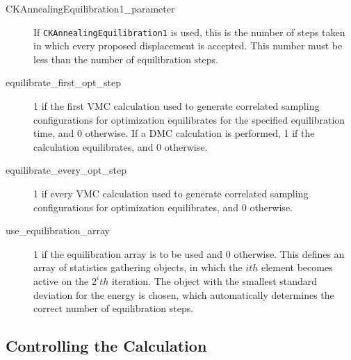 \documentclass[11pt]{article}
\begin{document}
\begin{description}
\item [CKAnnealingEquilibration1\_parameter]  If
  \verb-CKAnnealingEquilibration1- is used, this is the number of
  steps taken in which every proposed displacement is accepted.  This
  number must be less than the number of equilibration steps.  
 
\item [equilibrate\_first\_opt\_step] 1 if the first VMC calculation used
  to generate correlated sampling configurations for optimization
  equilibrates for the specified equilibration time, and 0 otherwise.
  If a DMC calculation is performed, 1 if the calculation
  equilibrates, and 0 otherwise.   

\item [equilibrate\_every\_opt\_step] 1 if every VMC calculation used to
  generate correlated sampling configurations for optimization
  equilibrates, and 0 otherwise.  

\item [use\_equilibration\_array] 1 if the equilibration array is to be
  used and 0 otherwise.  This defines an array of statistics gathering
  objects, in which the $ith$ element becomes active on the $2^{i}th$
  iteration.  The object with the smallest standard deviation for the
  energy is chosen, which automatically determines the correct number
  of equilibration steps.  

\end{description}

\subsection{Controlling the Calculation}
\end{document}
